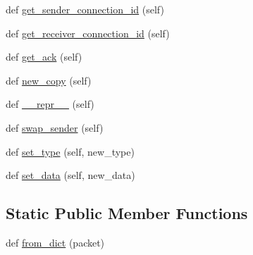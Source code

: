 \begin{DoxyCompactItemize}
\item 
def \hyperlink{classparlai_1_1mturk_1_1core_1_1legacy__2018_1_1socket__manager_1_1Packet_a023fe8d46cb9a3625ab278d7d72d0823}{get\+\_\+sender\+\_\+connection\+\_\+id} (self)
\item 
def \hyperlink{classparlai_1_1mturk_1_1core_1_1legacy__2018_1_1socket__manager_1_1Packet_ac2aeaa0f298f1dc750abbbcbd2ced9d6}{get\+\_\+receiver\+\_\+connection\+\_\+id} (self)
\item 
def \hyperlink{classparlai_1_1mturk_1_1core_1_1legacy__2018_1_1socket__manager_1_1Packet_ab28122db923d67d773b6c4af0360e6b0}{get\+\_\+ack} (self)
\item 
def \hyperlink{classparlai_1_1mturk_1_1core_1_1legacy__2018_1_1socket__manager_1_1Packet_aabcd943398680a33c0a313da2ec1a767}{new\+\_\+copy} (self)
\item 
def \hyperlink{classparlai_1_1mturk_1_1core_1_1legacy__2018_1_1socket__manager_1_1Packet_ab584329eae3598c36a1ae14a58be7e72}{\+\_\+\+\_\+repr\+\_\+\+\_\+} (self)
\item 
def \hyperlink{classparlai_1_1mturk_1_1core_1_1legacy__2018_1_1socket__manager_1_1Packet_ab8d13db3d0ac97cb33114593eb47d054}{swap\+\_\+sender} (self)
\item 
def \hyperlink{classparlai_1_1mturk_1_1core_1_1legacy__2018_1_1socket__manager_1_1Packet_a268873d6b357e25768ce83ed2ad605f6}{set\+\_\+type} (self, new\+\_\+type)
\item 
def \hyperlink{classparlai_1_1mturk_1_1core_1_1legacy__2018_1_1socket__manager_1_1Packet_a3e06e555eadd65177cea1346992cf9b8}{set\+\_\+data} (self, new\+\_\+data)
\end{DoxyCompactItemize}
\subsection*{Static Public Member Functions}
\begin{DoxyCompactItemize}
\item 
def \hyperlink{classparlai_1_1mturk_1_1core_1_1legacy__2018_1_1socket__manager_1_1Packet_a4ff11eed0eea4dcf2454533758f88a85}{from\+\_\+dict} (packet)
\end{DoxyCompactItemize}
